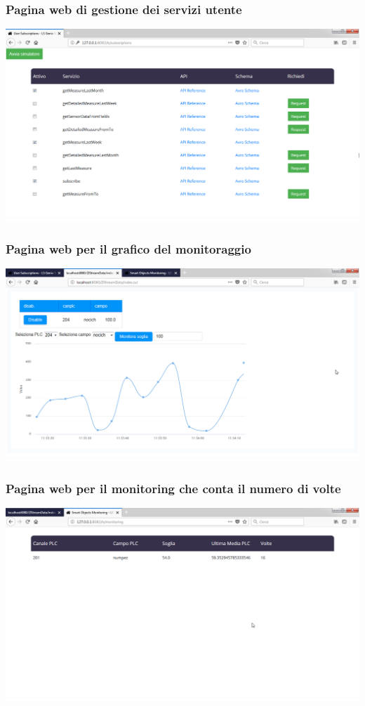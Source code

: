 \documentclass{beamer}
\begin{document}
\begin{frame}
\frametitle{Pagina web di gestione dei servizi utente}
\includegraphics[width=1\textwidth]{images/UserSubscriptionsPlatform.png}
\end{frame}

\begin{frame}
\frametitle{Pagina web per il grafico del monitoraggio}
\includegraphics[width=1\textwidth]{images/grafico-zk.png}
\end{frame}

\begin{frame}
\frametitle{Pagina web per il monitoring che conta il numero di volte}
\includegraphics[width=1\textwidth]{images/pagina-monitoraggio-web.png}
\end{frame}
\end{document}
